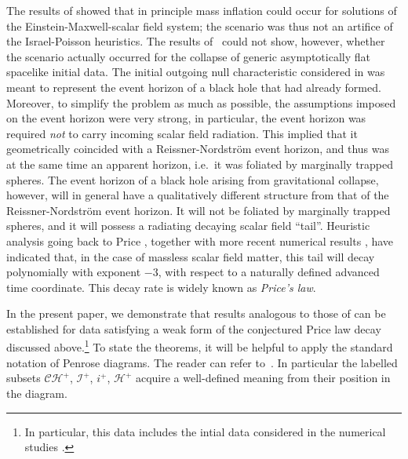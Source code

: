 \documentclass{article}
\begin{document}
The results of \cite{md:si} showed that in principle mass inflation
could occur for solutions of the Einstein-Maxwell-scalar field system;
the scenario was thus not
an artifice of the Israel-Poisson heuristics. The results
of~\cite{md:si}
could not show, however,
whether the scenario actually occurred
for the collapse of generic asymptotically flat 
spacelike initial data. 
The initial outgoing null characteristic 
considered in \cite{md:si}
was meant to represent the event horizon of a black hole
that had already formed. Moreover, to simplify the problem as much
as possible,  the assumptions imposed
on the event horizon
were very strong, in particular,
the event horizon was required \emph{not} to carry incoming
scalar field radiation. This implied that it geometrically
coincided with a Reissner-Nordstr\"om event horizon,
and thus was at the same time an apparent horizon, i.e.~it was
foliated by marginally trapped spheres.
The event horizon of a black hole arising from
gravitational collapse, however, will in general have a qualitatively
different structure from that of the Reissner-Nordstr\"om event horizon.
It will not be foliated by marginally trapped spheres,
and it will possess a radiating decaying scalar
field ``tail''. Heuristic analysis \cite{gpp:de1, lb:sbh, bo:lt, jb:gcc}
going back to Price \cite{rpr:ns},
together with more recent numerical results \cite{gpp:de, bo:lte, mc:bhsf},
have indicated that, in the case of massless scalar field matter,
this tail will decay polynomially with exponent $-3$,
with respect to a naturally defined advanced
time coordinate. This decay rate is widely known as
\emph{Price's law}.

In the present paper, we demonstrate that results analogous to those of
\cite{md:si} can be established for
data 
satisfying a weak form of the conjectured Price
law decay discussed above.\footnote{In particular, this
data includes the intial data considered in the numerical
studies \cite{brsm:bhs,lb:sb}.}
To state the theorems, it will be helpful to apply the
standard notation of Penrose diagrams. The reader 
can refer to~\cite{mi:mazi}. In particular
the labelled subsets $\mathcal{CH}^+$, $\mathcal{I}^+$, $i^+$, $\mathcal{H}^+$
acquire a well-defined meaning from their position in the diagram. 
\end{document}
